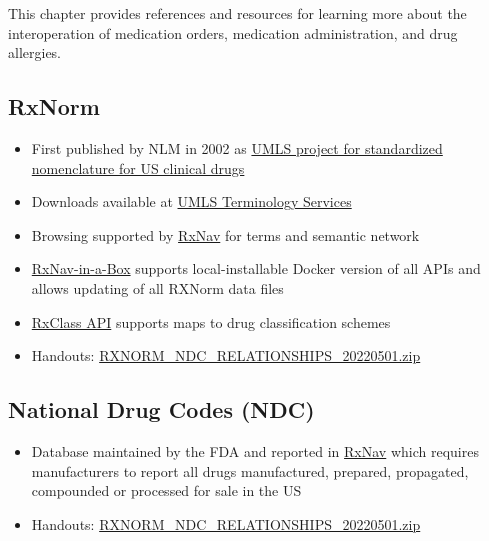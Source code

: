 \documentclass[
]{journal}
\providecommand{\tightlist}{%
  \setlength{\itemsep}{0pt}\setlength{\parskip}{0pt}}
\begin{document}
This chapter provides references and resources for learning more about the interoperation of medication orders, medication administration, and drug allergies.

\hypertarget{rxnorm}{%
\subsection{RxNorm}\label{rxnorm}}

\begin{itemize}
\tightlist
\item
  First published by NLM in 2002 as \href{https://www.nlm.nih.gov/research/umls/rxnorm/index.html}{UMLS project for standardized nomenclature for US clinical drugs}
\item
  Downloads available at \href{https://uts.nlm.nih.gov/uts/}{UMLS Terminology Services}
\item
  Browsing supported by \href{https://mor.nlm.nih.gov/RxNav/}{RxNav} for terms and semantic network
\item
  \href{https://lhncbc.nlm.nih.gov/RxNav/applications/RxNav-in-a-Box.html}{RxNav-in-a-Box} supports local-installable Docker version of all APIs and allows updating of all RXNorm data files
\item
  \href{https://lhncbc.nlm.nih.gov/RxNav/applications/RxClassIntro.html}{RxClass API} supports maps to drug classification schemes
\item
  Handouts: \href{https://github.com/UNMC-CRANE/AMIA_Workshop_May_2022/blob/main/Handouts/RXNORM_NDC_RELATIONSHIPS_20220501.zip}{RXNORM\_NDC\_RELATIONSHIPS\_20220501.zip}
\end{itemize}

\hypertarget{national-drug-codes-ndc}{%
\subsection{National Drug Codes (NDC)}\label{national-drug-codes-ndc}}

\begin{itemize}
\tightlist
\item
  Database maintained by the FDA and reported in \href{https://mor.nlm.nih.gov/RxNav/}{RxNav} which requires manufacturers to report all drugs manufactured, prepared, propagated, compounded or processed for sale in the US
\item
  Handouts: \href{https://github.com/UNMC-CRANE/AMIA_Workshop_May_2022/blob/main/Handouts/RXNORM_NDC_RELATIONSHIPS_20220501.zip}{RXNORM\_NDC\_RELATIONSHIPS\_20220501.zip}
\end{itemize}
\end{document}
